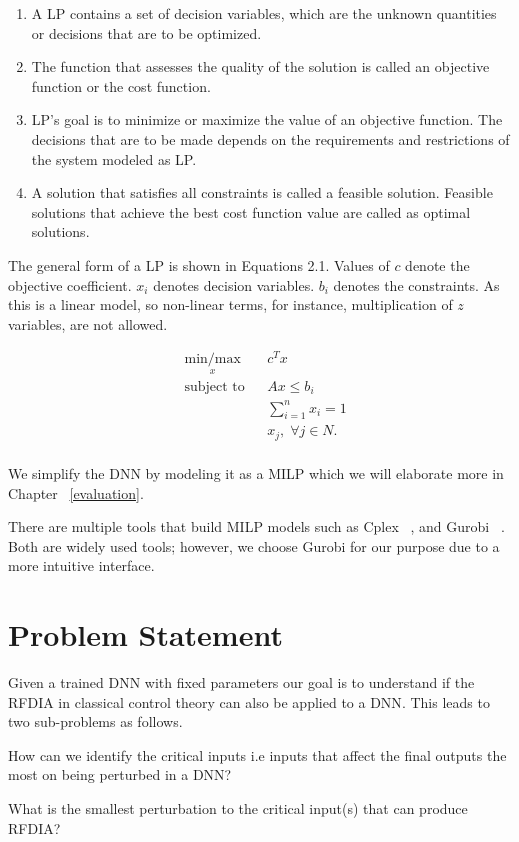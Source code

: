 \begin{enumerate}
	\item A \ac{LP} contains a set of decision variables, which are the unknown quantities or decisions that are to be optimized. 
	\item The function that assesses the quality of the solution is called an objective function or the cost function.
	\item \ac{LP}'s goal is to minimize or maximize the value of an objective function. 
	The decisions that are to be made depends on the requirements and restrictions of the  system modeled as \ac{LP}.
	\item A solution that satisfies all constraints is called a feasible solution. 
	Feasible solutions that achieve the best cost function value are called as optimal solutions. 
\end{enumerate}


The general form of a \ac{LP}  is shown in Equations 2.1. 
Values of $c$ denote the objective coefficient. 
$x_i$ denotes decision variables.
$b_i$ denotes the constraints.
As this is a linear model, so non-linear terms, for instance, multiplication of $z$ variables, are not allowed. 

\begin{equation}
\begin{aligned}
& \underset{x}{\text{min/max}}
& & c^T x \\
& \text{subject to} & &  Ax \leq b_i \\
& & &  \sum_{i=1}^{n} x_i =1 \\
& & &  x_j, \; \forall j \in N. \\
\end{aligned}
\end{equation}


We simplify the \ac{DNN} by modeling it as a \ac{MILP} which we will elaborate more in Chapter ~\ref{evaluation}.  

There are multiple tools that build \ac{MILP} models such as Cplex ~\cite{cplex}, and Gurobi ~\cite{gurobi}.
Both are widely used tools; however, we choose Gurobi for our purpose due to a more intuitive interface.  



\section{Problem Statement}
\label{problemstatement}

Given a trained DNN with fixed parameters our goal is to understand if the  \ac*{RFDIA} in classical control theory can also be applied to a \ac{DNN}.
This leads to two sub-problems as follows.

\begin{problem}
	How can we identify the critical inputs i.e inputs that  affect the final outputs the most on being perturbed in a \ac{DNN}?
\end{problem}

\begin{problem}
	What is the smallest perturbation to the critical input(s) that can produce \ac{RFDIA}?
\end{problem}




